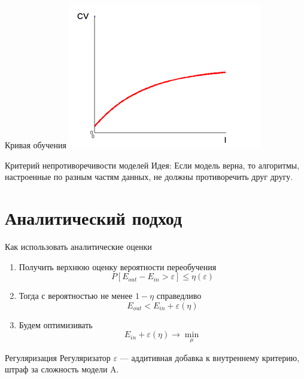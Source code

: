 \documentclass[10pt]{beamer}
\begin{document}
{
\begin{frame}{Кривая обучения}  
  \centering
  \includegraphics[width=0.7 \textwidth]{images/learning_curve1}
\end{frame}
}

\begin{frame}{Критерий непротиворечивости моделей}  
  \alert{Идея}: Если модель верна, то алгоритмы, настроенные по разным частям данных, не должны противоречить друг другу.\\
\end{frame}

\section{Аналитический подход}

\begin{frame}{Как использовать аналитические оценки}  
  \begin{enumerate}
    \item Получить верхнюю оценку вероятности переобучения\\
      $$P[E_{out} - E_{in} > \varepsilon] \leq \eta(\varepsilon)$$
    \item Тогда с вероятностью не менее $1-\eta$ справедливо\\
      $$E_{out} < E_{in} + \varepsilon(\eta)$$
    \item Будем оптимизивать \\
      $$E_{in} + \varepsilon(\eta) \rightarrow \min\limits_{\mu}$$
  \end{enumerate}
\end{frame}

\begin{frame}{Регуляризация}
  Регуляризатор $\varepsilon$ — аддитивная добавка к внутреннему критерию, штраф за сложность модели A.
\end{frame}
\end{document}
